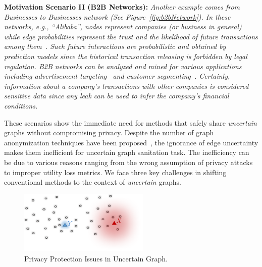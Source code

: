 \vspace{2mm}
{\textbf{Motivation Scenario II (B2B Networks): }}
{\em  Another example comes from Businesses to Businesses network (See Figure~\ref{fig:b2bNetwork}). In these networks, e.g., ``Alibaba'', nodes represent companies (or business in general) 
while edge probabilities represent the trust and the likelihood of future transactions among them~\cite{Lin_B2B}. Such future interactions are probabilistic and obtained by prediction models since the historical transaction releasing is forbidden by legal regulation. 
B2B networks can be analyzed and mined for various applications including advertisement targeting~\cite{Abrahams20132777} and customer segmenting~\cite{alsina2015targeting}. 
Certainly, information about a company's transactions with other companies is considered sensitive data since any leak can be used to infer the company's financial conditions.
}
 
\vspace{2mm}
These scenarios show the immediate need for methods that safely share \emph{uncertain} graphs without compromising privacy. 
Despite the number of graph anonymization techniques have been proposed~\cite{Liu_Towards_2008, Boldi_Injecting_2012,  Mittal_Preserving_2013, Bonchi_Identity_2014}, the ignorance of edge uncertainty makes them inefficient for uncertain graph sanitation task. The inefficiency can be due to various reasons ranging from the wrong assumption of privacy attacks to improper utility loss metrics. We face three key challenges in shifting conventional methods to the context of \emph{uncertain} graphs.

\begin{figure}
  \centering
  \vspace{-5pt}
  \includegraphics[height=3cm]{AddFigure/privacyIssue.pdf}
   \vspace{-5pt}
  \caption{Privacy Protection Issues in Uncertain Graph.}
  \label{fig:privacyIssue}
  \vspace{-15pt}
\end{figure}

